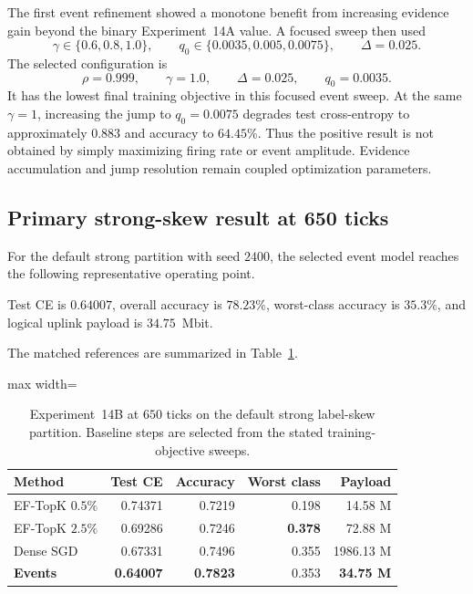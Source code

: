 The first event refinement showed a monotone benefit from increasing evidence gain beyond the binary Experiment~14A value. A focused sweep then used
\begin{equation}
\gamma\in\{0.6,0.8,1.0\},
\qquad
q_0\in\{0.0035,0.005,0.0075\},
\qquad
\Delta=0.025.
\end{equation}
The selected configuration is
\begin{equation}
\boxed{
\rho=0.999,\qquad
\gamma=1.0,\qquad
\Delta=0.025,\qquad
q_0=0.0035.
}
\end{equation}
It has the lowest final training objective in this focused event sweep. At the same $\gamma=1$, increasing the jump to $q_0=0.0075$ degrades test cross-entropy to approximately $0.883$ and accuracy to $64.45\%$. Thus the positive result is not obtained by simply maximizing firing rate or event amplitude. Evidence accumulation and jump resolution remain coupled optimization parameters.

\subsection{Primary strong-skew result at 650 ticks}

For the default strong partition with seed $2400$, the selected event model reaches the following representative operating point.
\begin{takeawaybox}[title={Experiment 14B primary event result}]
Test CE is $0.64007$, overall accuracy is $78.23\%$, worst-class accuracy is $35.3\%$, and logical uplink payload is $34.75$~Mbit.
\end{takeawaybox}
The matched references are summarized in Table~\ref{tab:exp14b-primary}.

\begin{table}[t]
\centering
\caption{Experiment~14B at $650$ ticks on the default strong label-skew partition. Baseline steps are selected from the stated training-objective sweeps.}
\label{tab:exp14b-primary}
\begin{adjustbox}{max width=\textwidth}
\begin{tabular}{lrrrr}
\toprule
Method & Test CE & Accuracy & Worst class & Payload\\
\midrule
EF-TopK $0.5\%$ & 0.74371 & 0.7219 & 0.198 & 14.58 M\\
EF-TopK $2.5\%$ & 0.69286 & 0.7246 & \textbf{0.378} & 72.88 M\\
Dense SGD & 0.67331 & 0.7496 & 0.355 & 1986.13 M\\
\textbf{Events} & \textbf{0.64007} & \textbf{0.7823} & 0.353 & \textbf{34.75 M}\\
\bottomrule
\end{tabular}
\end{adjustbox}
\end{table}


